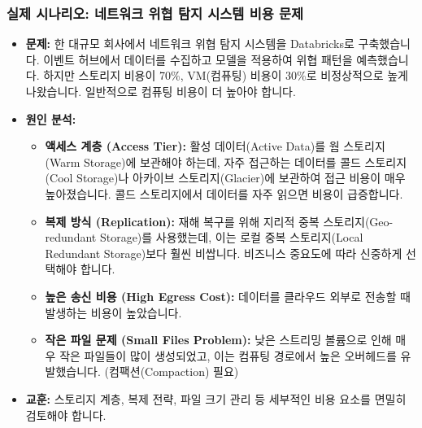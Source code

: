 \documentclass[11pt,a4paper]{article}
\theoremstyle{definition}
\begin{document}
\subsubsection{실제 시나리오: 네트워크 위협 탐지 시스템 비용 문제}
\begin{itemize}
    \item \textbf{문제:} 한 대규모 회사에서 네트워크 위협 탐지 시스템을 Databricks로 구축했습니다. 이벤트 허브에서 데이터를 수집하고 모델을 적용하여 위협 패턴을 예측했습니다. 하지만 스토리지 비용이 70\%, VM(컴퓨팅) 비용이 30\%로 비정상적으로 높게 나왔습니다. 일반적으로 컴퓨팅 비용이 더 높아야 합니다.
    \item \textbf{원인 분석:}
    \begin{itemize}
        \item \textbf{액세스 계층 (Access Tier):} 활성 데이터(Active Data)를 웜 스토리지(Warm Storage)에 보관해야 하는데, 자주 접근하는 데이터를 콜드 스토리지(Cool Storage)나 아카이브 스토리지(Glacier)에 보관하여 접근 비용이 매우 높아졌습니다. 콜드 스토리지에서 데이터를 자주 읽으면 비용이 급증합니다.
        \item \textbf{복제 방식 (Replication):} 재해 복구를 위해 지리적 중복 스토리지(Geo-redundant Storage)를 사용했는데, 이는 로컬 중복 스토리지(Local Redundant Storage)보다 훨씬 비쌉니다. 비즈니스 중요도에 따라 신중하게 선택해야 합니다.
        \item \textbf{높은 송신 비용 (High Egress Cost):} 데이터를 클라우드 외부로 전송할 때 발생하는 비용이 높았습니다.
        \item \textbf{작은 파일 문제 (Small Files Problem):} 낮은 스트리밍 볼륨으로 인해 매우 작은 파일들이 많이 생성되었고, 이는 컴퓨팅 경로에서 높은 오버헤드를 유발했습니다. (컴팩션(Compaction) 필요)
    \end{itemize}
    \item \textbf{교훈:} 스토리지 계층, 복제 전략, 파일 크기 관리 등 세부적인 비용 요소를 면밀히 검토해야 합니다.
\end{itemize}
\end{document}
